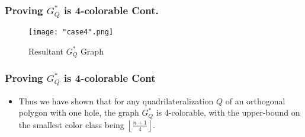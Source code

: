 \documentclass{beamer}
\begin{document}
\begin{frame}
\frametitle{Proving $G^{*}_Q$ is 4-colorable Cont.}
	\begin{center}
	\begin{figure}[H]
	\caption{Resultant $G^{*}_Q$ Graph}
	\centering
	\texttt{[image: "case4".png]}
	\end{figure}
	\end{center}
\end{frame}



\begin{frame}
\frametitle{Proving $G^{*}_Q$ is 4-colorable Cont}
\begin{itemize}
	\item Thus we have shown that for any quadrilateralization $Q$ of an orthogonal polygon with one hole, the graph $G^*_Q$ is 4-colorable, with the upper-bound on the smallest color class being $\left \lfloor{\frac{n+1}{4}}\right \rfloor$.  
\end{itemize}
\end{frame}
\end{document}
